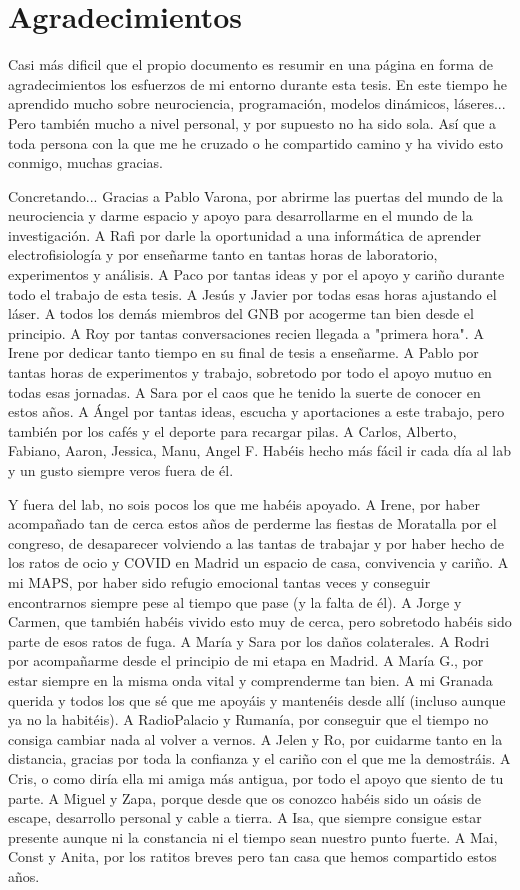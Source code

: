 \chapter*{Agradecimientos}
Casi más dificil que el propio documento es resumir en una página en forma de agradecimientos los esfuerzos de mi entorno durante esta tesis. En este tiempo he aprendido mucho sobre neurociencia, programación, modelos dinámicos, láseres... Pero también mucho a nivel personal, y por supuesto no ha sido sola. Así que a toda persona con la que me he cruzado o he compartido camino y ha vivido esto conmigo, muchas gracias. 

Concretando... Gracias a Pablo Varona, por abrirme las puertas del mundo de la neurociencia y darme espacio y apoyo para desarrollarme en el mundo de la investigación. A Rafi por darle la oportunidad a una informática de aprender electrofisiología y por enseñarme tanto en tantas horas de laboratorio, experimentos y análisis. A Paco por tantas ideas y por el apoyo y cariño durante todo el trabajo de esta tesis. A Jesús y Javier por todas esas horas ajustando el láser. A todos los demás miembros del GNB por acogerme tan bien desde el principio. A Roy por tantas conversaciones recien llegada a "primera hora". A Irene por dedicar tanto tiempo en su final de tesis a enseñarme. A Pablo por tantas horas de experimentos y trabajo, sobretodo por todo el apoyo mutuo en todas esas jornadas. A Sara por el caos que he tenido la suerte de conocer en estos años. A Ángel por tantas ideas, escucha y aportaciones a este trabajo, pero también por los cafés y el deporte para recargar pilas. A Carlos, Alberto, Fabiano, Aaron, Jessica, Manu, Angel F. Habéis hecho más fácil ir cada día al lab y un gusto siempre veros fuera de él. 


Y fuera del lab, no sois pocos los que me habéis apoyado. A Irene, por haber acompañado tan de cerca estos años de perderme las fiestas de Moratalla por el congreso, de desaparecer volviendo a las tantas de trabajar y por haber hecho de los ratos de ocio y COVID en Madrid un espacio de casa, convivencia y cariño. A mi MAPS, por haber sido refugio emocional tantas veces y conseguir encontrarnos siempre pese al tiempo que pase (y la falta de él). A Jorge y Carmen, que también habéis vivido esto muy de cerca, pero sobretodo habéis sido parte de esos ratos de fuga. A María y Sara por los daños colaterales. A Rodri por acompañarme desde el principio de mi etapa en Madrid. A María G., por estar siempre en la misma onda vital y comprenderme tan bien. A mi Granada querida y todos los que sé que me apoyáis y mantenéis desde allí (incluso aunque ya no la habitéis). A RadioPalacio y Rumanía, por conseguir que el tiempo no consiga cambiar nada al volver a vernos. A Jelen y Ro, por cuidarme tanto en la distancia, gracias por toda la confianza y el cariño con el que me la demostráis. A Cris, o como diría ella mi amiga más antigua, por todo el apoyo que siento de tu parte. A Miguel y Zapa, porque desde que os conozco habéis sido un oásis de escape, desarrollo personal y cable a tierra. A Isa, que siempre consigue estar presente aunque ni la constancia ni el tiempo sean nuestro punto fuerte. A Mai, Const y Anita, por los ratitos breves pero tan casa que hemos compartido estos años.

